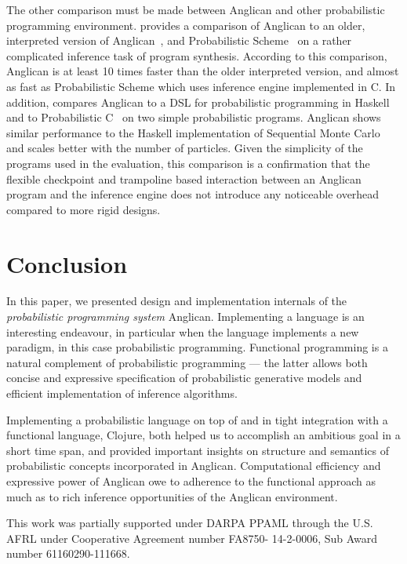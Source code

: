 \documentclass[preprint]{sigplanconf}
\begin{document}
The other comparison must be made between Anglican and other
probabilistic programming environment. \cite[pp. 32 -- 33]{P16} 
provides a comparison of Anglican to an older, interpreted
version of Anglican~\cite{WVM14}, and Probabilistic
Scheme~\cite{PW14} on a rather complicated inference task of
program synthesis. According to this comparison, Anglican is at
least 10 times faster than the older interpreted version, and
almost as fast as Probabilistic Scheme which uses inference
engine implemented in C. In addition, \cite[p. 171]{SGG15}
compares Anglican to a DSL for probabilistic programming in
Haskell and to Probabilistic C~\cite{PW14} on two simple
probabilistic programs. Anglican shows similar performance
to the Haskell implementation of Sequential Monte
Carlo~\cite{DFG+01} and scales better with the number of
particles. Given the simplicity of the programs used in the
evaluation, this comparison is a confirmation that the flexible
checkpoint and trampoline based interaction between an Anglican
program and the inference engine does not introduce any noticeable
overhead compared to more rigid designs.

\section{Conclusion}
\label{seq:summary}

In this paper, we presented design and implementation internals
of the \emph{probabilistic programming system} Anglican. Implementing
a language is an interesting endeavour, in particular when the
language implements a new paradigm, in this case probabilistic
programming. Functional programming is a natural complement of
probabilistic programming --- the latter allows both concise and
expressive specification of probabilistic generative models and
efficient implementation of inference algorithms.

Implementing a probabilistic language on top of and in tight
integration with a functional language, Clojure, both helped
us to accomplish an ambitious goal in a short time span, and
provided important insights on structure and semantics of
probabilistic concepts incorporated in Anglican. Computational
efficiency and expressive power of Anglican owe to adherence to
the functional approach as much as to rich inference
opportunities of the Anglican environment.

\acks

This work was partially supported under DARPA PPAML through the
U.S. AFRL under Cooperative Agreement number FA8750- 14-2-0006,
Sub Award number 61160290-111668.



\end{document}
